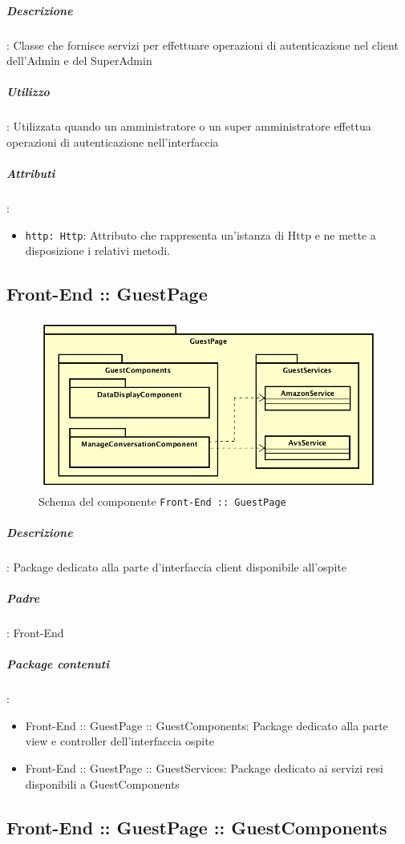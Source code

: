 \documentclass[../ManualeSviluppatore_v2.0.0.tex]{subfiles}
\begin{document}
				\subparagraph{Descrizione}: Classe che fornisce servizi per effettuare operazioni di autenticazione nel client dell'Admin e del SuperAdmin
				\subparagraph{Utilizzo}: Utilizzata quando un amministratore o un super amministratore effettua operazioni di autenticazione nell'interfaccia
				\subparagraph{Attributi}:
				\begin{itemize}
					\item \texttt{http: Http}: Attributo che rappresenta un'istanza di Http e ne mette a disposizione i relativi metodi.
				\end{itemize}
	\newpage
	\subsection{Front-End :: GuestPage}
	\begin{figure}[!h]
		\centering
		\includegraphics[scale=0.6]{Architettura/Front-End/GuestPage/GuestPage.png}
		\caption{Schema del componente \texttt{Front-End :: GuestPage}}
	\end{figure}

			\subparagraph{Descrizione}: Package dedicato alla parte d'interfaccia client disponibile all'ospite
			\subparagraph{Padre}: Front-End
			\subparagraph{Package contenuti}:
			\begin{itemize}
				\item Front-End :: GuestPage :: GuestComponents: Package dedicato alla parte view e controller dell'interfaccia ospite
				\item Front-End :: GuestPage :: GuestServices: Package dedicato ai servizi resi disponibili a GuestComponents
			\end{itemize}


	\newpage
	\subsection{Front-End :: GuestPage :: GuestComponents}
\end{document}
